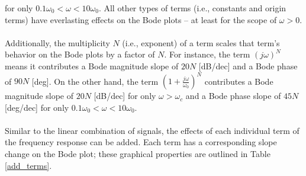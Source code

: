 \documentclass{report}
\begin{document}
for only $0.1\omega_0 < \omega < 10\omega_0$. All other types of terms (i.e., constants and origin terms) have everlasting effects on the Bode plots -- at least for the scope of $\omega > 0$.
\\ \\ 
Additionally, the multiplicity $N$ (i.e., exponent) of a term scales that term's behavior on the Bode plots by a factor of $N$. For instance, the term $(j\omega)^N$ means it contributes a Bode magnitude slope of $20N$ [dB/dec] and 
a Bode phase of $90N$ [deg]. On the other hand, the term $\left(1+\frac{j\omega}{\omega_0}\right)^N$ contributes a Bode magnitude slope of $20N$ [dB/dec] for only $\omega>\omega_c$ and a Bode phase slope of $45N$ [deg/dec] for only 
$0.1\omega_0<\omega<10\omega_0$.
\\ \\
Similar to the linear combination of signals, the effects of each individual term of the frequency response can be added. Each term has a corresponding slope change on the Bode plot; these graphical properties 
are outlined in Table \ref{add_terms}.
\begin{table}
    \small
    \centering
    \caption{Graphical properties of frequency response terms on the Bode plot.}
    \label{add_terms}
\end{table}
\end{document}
